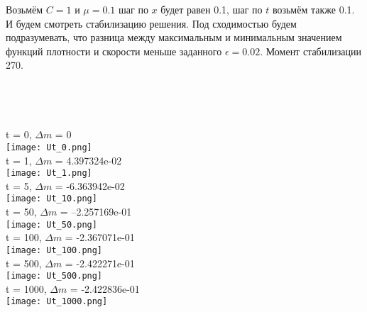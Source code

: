 \documentclass[a4paper, 12pt]{article}
\begin{document}
Возьмём \(C = 1\) и \(\mu = 0.1\) шаг по \(x\) будет равен 0.1, шаг по \(t\) возьмём также 0.1. И будем смотреть стабилизацию решения. Под сходимостью будем подразумевать, что разница между максимальным и минимальным значением функций плотности и скорости меньше заданного \(\epsilon = 0.02\). Момент стабилизации 270.
\\
\\
\\
\\
\\
t = 0, \(\Delta m\) = 0
\\
\texttt{[image: Ut\_0.png]}
\\
\newpage
t = 1, \(\Delta m\) = 4.397324e-02
\\
\texttt{[image: Ut\_1.png]}
\\

t = 5, \(\Delta m\) = -6.363942e-02
\\
\texttt{[image: Ut\_10.png]}
\\

t = 50, \(\Delta m\) = --2.257169e-01
\\
\texttt{[image: Ut\_50.png]}
\\
t = 100, \(\Delta m\) = -2.367071e-01
\\
\texttt{[image: Ut\_100.png]}
\\
t = 500, \(\Delta m\) = -2.422271e-01
\\
\texttt{[image: Ut\_500.png]}
\\
t = 1000, \(\Delta m\) = -2.422836e-01
\\
\texttt{[image: Ut\_1000.png]}
\\
\end{document}
